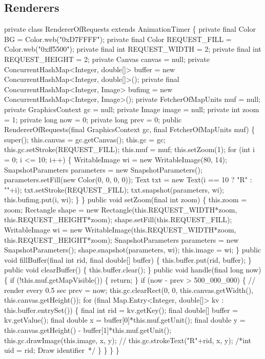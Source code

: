 \subsection{Renderers}
\nwenddocs{}\plusendmoddef
private class RendererOfRequests extends AnimationTimer \{
  private final Color BG = Color.web("0xD7FFFF");
  private final Color REQUEST_FILL = Color.web("0xff5500");
  private final int REQUEST_WIDTH = 2;
  private final int REQUEST_HEIGHT = 2;
  private Canvas canvas = null;
  private ConcurrentHashMap<Integer, double[]> buffer =
      new ConcurrentHashMap<Integer, double[]>();
  private final ConcurrentHashMap<Integer, Image> bufimg =
      new ConcurrentHashMap<Integer, Image>();
  private FetcherOfMapUnits muf = null;
  private GraphicsContext gc = null;
  private Image image = null;
  private int zoom = 1;
  private long now = 0;
  private long prev = 0;
  public RendererOfRequests(final GraphicsContext gc, final FetcherOfMapUnits muf) \{
    super();
    this.canvas = gc.getCanvas();
    this.gc = gc;
    this.gc.setStroke(REQUEST_FILL);
    this.muf = muf;
    this.setZoom(1);
    for (int i = 0; i <= 10; i++) \{
      WritableImage wi = new WritableImage(80, 14);
      SnapshotParameters parameters = new SnapshotParameters();
      parameters.setFill(new Color(0, 0, 0, 0));
      Text txt = new Text(i == 10 ? "R" : ""+i);
      txt.setStroke(REQUEST_FILL);
      txt.snapshot(parameters, wi);
      this.bufimg.put(i, wi);
    \}
  \}
  public void setZoom(final int zoom) \{
    this.zoom = zoom;
    Rectangle shape = new Rectangle(this.REQUEST_WIDTH*zoom, this.REQUEST_HEIGHT*zoom);
    shape.setFill(this.REQUEST_FILL);
    WritableImage wi = new WritableImage(this.REQUEST_WIDTH*zoom, this.REQUEST_HEIGHT*zoom);
    SnapshotParameters parameters = new SnapshotParameters();
    shape.snapshot(parameters, wi);
    this.image = wi;
  \}
  public void fillBuffer(final int rid, final double[] buffer) \{
    this.buffer.put(rid, buffer);
  \}
  public void clearBuffer() \{
    this.buffer.clear();
  \}
  public void handle(final long now) \{
    if (!this.muf.getMapVisible()) \{
      return;
    \}
    if (now - prev > 500_000_000) \{  // render every 0.5 sec
      prev = now;
      this.gc.clearRect(0, 0, this.canvas.getWidth(), this.canvas.getHeight());
      for (final Map.Entry<Integer, double[]> kv : this.buffer.entrySet()) \{
        final int rid = kv.getKey();
        final double[] buffer = kv.getValue();
        final double x = buffer[0]*this.muf.getUnit();
        final double y = this.canvas.getHeight() - buffer[1]*this.muf.getUnit();
        this.gc.drawImage(this.image, x, y);
        // this.gc.strokeText("R"+rid, x, y);
        /*int uid = rid;
        \LA{}Draw identifier~{\nwtagstyle{}}\RA{}*/
      \}
    \}
  \}
\}
\nwendcode{}\nwdocspar

